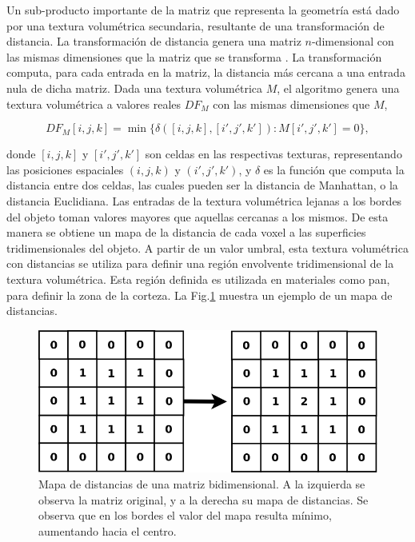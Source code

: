 Un sub-producto importante de la matriz que representa la geometría está dado por una textura volumétrica secundaria, resultante de una transformación de distancia.
La transformación de distancia genera una matriz $n$-dimensional con las mismas dimensiones que la matriz que se transforma \cite{osh03}.
La transformación computa, para cada entrada en la matriz, la distancia más cercana a una entrada nula de dicha matriz.
Dada una textura volumétrica $M$, el algoritmo genera una textura volumétrica a valores reales $DF_{M}$ con las mismas dimensiones que $M$,


$$DF_{M}[i,j,k] = \min \bigg\{ \delta([i,j,k],[i',j',k']): M[i',j',k'] = 0 \bigg\},$$


\noindent donde $[i,j,k]$ y $[i',j',k']$ son celdas en las respectivas texturas, representando las posiciones espaciales $(i,j,k)$ y $(i',j',k')$, y $\delta$ es la función que computa la distancia entre dos celdas, las cuales pueden ser la distancia de Manhattan, o la distancia Euclidiana.
Las entradas de la textura volumétrica lejanas a los bordes del objeto toman valores mayores que aquellas cercanas a los mismos.
De esta manera se obtiene un mapa de la distancia de cada voxel a las superficies tridimensionales del objeto.
A partir de un valor umbral, esta textura volumétrica con distancias se utiliza para definir una región envolvente tridimensional de la textura volumétrica.
Esta región definida es utilizada en materiales como pan, para definir la zona de la corteza.
La Fig.\ref{fg:distance} muestra un ejemplo de un mapa de distancias.

\begin{figure}
\includegraphics[width=12cm]{figures/distance}
\caption[Mapa de distancias de una matriz bidimensional]{Mapa de distancias de una matriz bidimensional. A la izquierda se observa la matriz original, y a la derecha su mapa de distancias. Se observa que en los bordes el valor del mapa resulta mínimo, aumentando hacia el centro.}
\label{fg:distance}
\end{figure}

